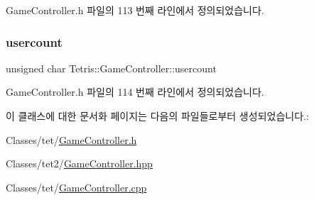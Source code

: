 Game\+Controller.\+h 파일의 113 번째 라인에서 정의되었습니다.

\mbox{\label{class_tetris_1_1_game_controller_aafb18b3b4fe5621bfb60fc42b1e8da09}} 
\subsubsection{\texorpdfstring{usercount}{usercount}}
{\footnotesize\ttfamily unsigned char Tetris\+::\+Game\+Controller\+::usercount\hspace{0.3cm}{\ttfamily [protected]}}



Game\+Controller.\+h 파일의 114 번째 라인에서 정의되었습니다.



이 클래스에 대한 문서화 페이지는 다음의 파일들로부터 생성되었습니다.\+:\begin{DoxyCompactItemize}
\item 
Classes/tet/\hyperlink{_game_controller_8h}{Game\+Controller.\+h}\item 
Classes/tet2/\hyperlink{_game_controller_8hpp}{Game\+Controller.\+hpp}\item 
Classes/tet/\hyperlink{_game_controller_8cpp}{Game\+Controller.\+cpp}\end{DoxyCompactItemize}
